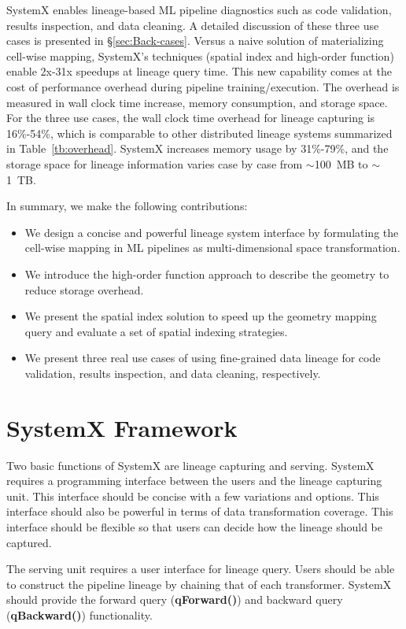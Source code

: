 \documentclass{sig-alternate}
\newenvironment{shortlist}{
        \vspace*{-0.5em}
  \begin{itemize}
  \setlength{\itemsep}{-0.1em}
}{
  \end{itemize}
        \vspace*{-0.5em}
}
\begin{document}
SystemX enables lineage-based ML pipeline diagnostics such as code validation, results inspection, and data cleaning.
A detailed discussion of these three use cases is presented in \S\ref{sec:Back-cases}.
Versus a naive solution of materializing cell-wise mapping, 
SystemX's techniques (spatial index and high-order function) enable 2x-31x speedups at lineage query time.
This new capability comes at the cost of performance overhead during pipeline training/execution.
The overhead is measured in wall clock time increase, memory consumption, and storage space.
For the three use cases, the wall clock time overhead for lineage capturing is 16\%-54\%, which is comparable to other distributed lineage systems
summarized in Table~\ref{tb:overhead}.
SystemX increases memory usage by 31\%-79\%,
and the storage space for lineage information varies case by case from $\sim$100~MB to $\sim$1~TB.


In summary, we make the following contributions:
\begin{shortlist}
\item{} We design a concise and powerful lineage system interface by formulating the cell-wise mapping in ML pipelines as multi-dimensional space transformation.
\item{} We introduce the high-order function approach to describe the geometry to reduce storage overhead.
\item{} We present the spatial index solution to speed up the geometry mapping query and evaluate a set of spatial indexing strategies.
\item{} We present three real use cases of using fine-grained data lineage for code validation, results inspection, and data cleaning, respectively.
\end{shortlist}

\section{S\MakeLowercase{ystem}X Framework}
\label{sec:functional}
Two basic functions of SystemX are lineage capturing and serving.
SystemX requires a programming interface between the users and the lineage capturing unit. 
This interface should be concise with a few variations and options.
This interface should also be powerful in terms of data transformation coverage.
This interface should be flexible so that users can decide how the lineage should be captured.

The serving unit requires a user interface for lineage query.
Users should be able to construct the pipeline lineage by chaining that of each transformer.
SystemX should provide the forward query ({\bf qForward()}) and backward query ({\bf qBackward()}) functionality.
\end{document}
